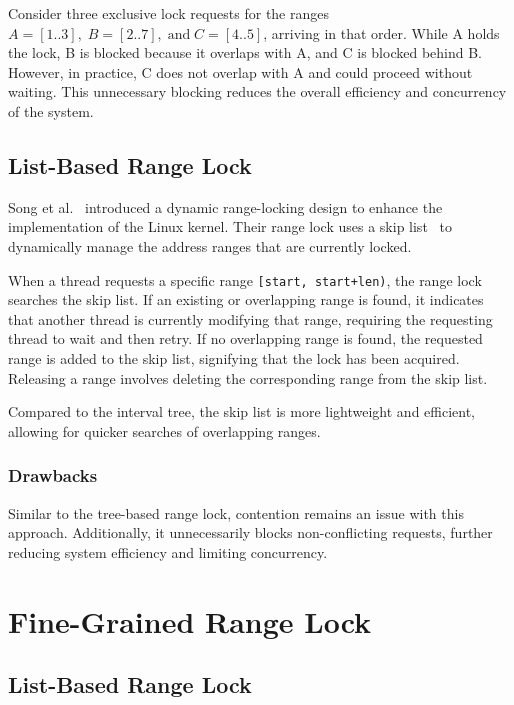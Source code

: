 Consider three exclusive lock requests for the ranges \( A = [1..3], \; B = [2..7], \; \text{and} \; C = [4..5] \), arriving in that order. While A holds the lock, B is blocked because it overlaps with A, and C is blocked behind B. However, in practice, C does not overlap with A and could proceed without waiting. This unnecessary blocking reduces the overall efficiency and concurrency of the system.

\subsection{List-Based Range Lock}\label{subsec:listbase}

Song et al.~\parencite{song2013parallelizing} introduced a dynamic range-locking design to enhance the implementation of the Linux kernel. Their range lock uses a skip list~\parencite{pugh1990skip} to dynamically manage the address ranges that are currently locked.

When a thread requests a specific range \texttt{[start, start+len)}, the range lock searches the skip list. If an existing or overlapping range is found, it indicates that another thread is currently modifying that range, requiring the requesting thread to wait and then retry. If no overlapping range is found, the requested range is added to the skip list, signifying that the lock has been acquired. Releasing a range involves deleting the corresponding range from the skip list.

Compared to the interval tree, the skip list is more lightweight and efficient, allowing for quicker searches of overlapping ranges.

\subsubsection*{Drawbacks}

Similar to the tree-based range lock, contention remains an issue with this approach. Additionally, it unnecessarily blocks non-conflicting requests, further reducing system efficiency and limiting concurrency.

\section{Fine-Grained Range Lock}

\subsection{List-Based Range Lock}

